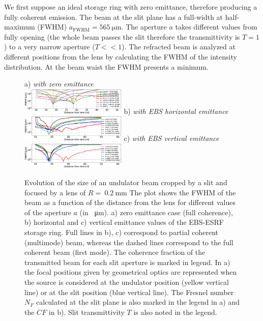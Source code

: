 \documentclass[9pt,twocolumn,twoside]{osajnl}
\begin{document}
We first suppose an ideal storage ring with zero emittance, therefore producing a fully coherent emission. The beam at the slit plane has a full-width at half-maximum (FWHM) $a_\text{FWHM}=\SI{565}{\micro\meter}$. The aperture $a$ takes different values from fully opening (the whole beam passes the slit therefore the transmittivity is $T=1$) to a very narrow aperture ($T << 1$). The refracted beam is analyzed at different positions from the lens by calculating the FWHM of the intensity distribution. At the beam waist the FWHM presents a minimum. 

\begin{figure}[htbp]
\centering
\flushleft a) {\it with zero emittance}\\ \centering
\includegraphics[width=0.45\textwidth]{figures/oneTF_UndSource_RectSlit_R200um.eps}
\flushleft b) {\it with EBS horizontal emittance}\\ \centering
\includegraphics[width=0.45\textwidth]{figures/oneTF_UndSource_RectSlit_R200um_PartialCoherence_h.eps}
\flushleft c) {\it with EBS vertical emittance}\\ \centering
\includegraphics[width=0.45\textwidth]{figures/oneTF_UndSource_RectSlit_R200um_PartialCoherence_v.eps}

\caption{Evolution of the size of an undulator beam cropped by a slit and focused by a lens of $R=~\SI{0.2}{\milli\meter}$
The plot shows the FWHM of the beam  as a function of the distance from the lens for different values of the aperture $a$ (in \SI{}{\micro\meter}). 
a) zero emittance case (full coherence), 
b) horizontal and c) vertical emittance values of the EBS-ESRF storage ring.
Full lines in b), c) correspond to partial coherent (multimode) beam, whereas the dashed lines correspond to the full coherent beam (first mode). The coherence fraction of the transmitted beam for each slit aperture is marked in legend.
In a) the focal positions given by geometrical optics are represented when the source is considered at the undulator position (yellow vertical line) or at the slit position (blue vertical line). The Fresnel number $N_F$ calculated at the slit plane is also marked in the legend in a) and the $CF$ in b). Slit transmittivity $T$ is also noted in the legend.
}
\label{fig:oneTFund}
\end{figure}
\end{document}
